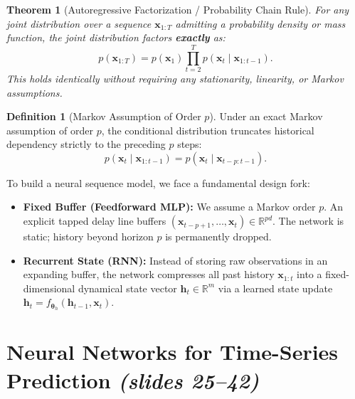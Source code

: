 \documentclass[11pt,a4paper]{article}
\theoremstyle{definition}
\newtheorem{definition}{Definition}[section]
\theoremstyle{plain}
\newtheorem{theorem}{Theorem}[section]
\begin{document}
\begin{theorem}[Autoregressive Factorization / Probability Chain Rule]
For any joint distribution over a sequence $\mathbf{x}_{1:T}$ admitting a probability density or mass function, the joint distribution factors \textbf{exactly} as:
\begin{equation}
    p(\mathbf{x}_{1:T}) = p(\mathbf{x}_1) \prod_{t=2}^T p(\mathbf{x}_t \mid \mathbf{x}_{1:t-1}).
\end{equation}
This holds identically without requiring any stationarity, linearity, or Markov assumptions.
\end{theorem}

\begin{definition}[Markov Assumption of Order $p$]
Under an exact Markov assumption of order $p$, the conditional distribution truncates historical dependency strictly to the preceding $p$ steps:
\begin{equation}
    p(\mathbf{x}_t \mid \mathbf{x}_{1:t-1}) = p(\mathbf{x}_t \mid \mathbf{x}_{t-p:t-1}).
\end{equation}
\end{definition}

\begin{intuitionbox}
To build a neural sequence model, we face a fundamental design fork:
\begin{itemize}
    \item \textbf{Fixed Buffer (Feedforward MLP):} We assume a Markov order $p$. An explicit tapped delay line buffers $(\mathbf{x}_{t-p+1}, \dots, \mathbf{x}_t) \in \mathbb{R}^{pd}$. The network is static; history beyond horizon $p$ is permanently dropped.
    \item \textbf{Recurrent State (RNN):} Instead of storing raw observations in an expanding buffer, the network compresses all past history $\mathbf{x}_{1:t}$ into a fixed-dimensional dynamical state vector $\mathbf{h}_t \in \mathbb{R}^m$ via a learned state update $\mathbf{h}_t = f_{\boldsymbol{\theta}_h}(\mathbf{h}_{t-1}, \mathbf{x}_t)$.
\end{itemize}
\end{intuitionbox}

\section{Neural Networks for Time-Series Prediction \emph{(slides 25--42)}}
\end{document}
